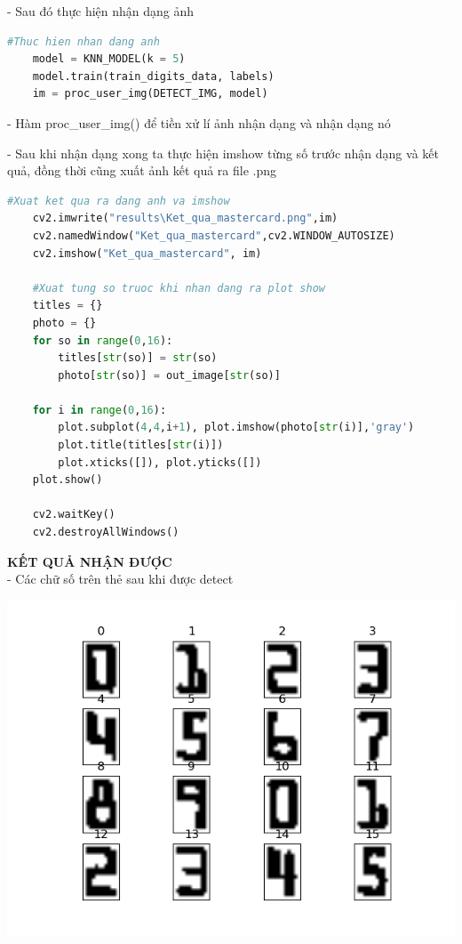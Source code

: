 - Sau đó thực hiện nhận dạng ảnh
\begin{lstlisting}[language=Python]
    #Thuc hien nhan dang anh 
    model = KNN_MODEL(k = 5)
    model.train(train_digits_data, labels)
    im = proc_user_img(DETECT_IMG, model)
\end{lstlisting}

- Hàm proc\_user\_img() để tiền xử lí ảnh nhận dạng và nhận dạng nó

- Sau khi nhận dạng xong ta thực hiện imshow từng số trước nhận dạng và kết quả, đồng thời cũng xuất ảnh kết quả ra file .png
\begin{lstlisting}[language=Python]
    #Xuat ket qua ra dang anh va imshow
    cv2.imwrite("results\Ket_qua_mastercard.png",im)
    cv2.namedWindow("Ket_qua_mastercard",cv2.WINDOW_AUTOSIZE)
    cv2.imshow("Ket_qua_mastercard", im)

    #Xuat tung so truoc khi nhan dang ra plot show
    titles = {}
    photo = {}
    for so in range(0,16):		
        titles[str(so)] = str(so)
        photo[str(so)] = out_image[str(so)]

    for i in range(0,16):
	    plot.subplot(4,4,i+1), plot.imshow(photo[str(i)],'gray')
	    plot.title(titles[str(i)])
	    plot.xticks([]), plot.yticks([])
    plot.show()
    
    cv2.waitKey() 
    cv2.destroyAllWindows()          
\end{lstlisting}

\quad \textbf{KẾT QUẢ NHẬN ĐƯỢC} \\[0.2cm]

- Các chữ số trên thẻ sau khi được detect 

\includegraphics[]{images/mastercard/digits.png}

